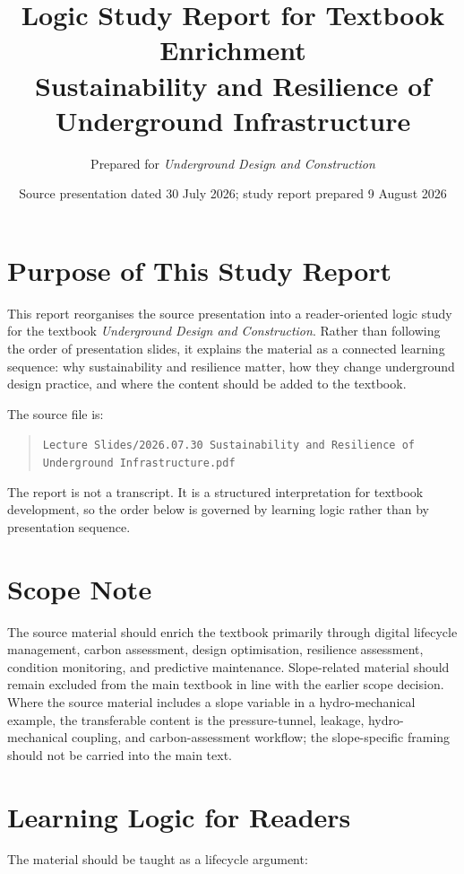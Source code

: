 \documentclass[11pt]{article}
\title{Logic Study Report for Textbook Enrichment\\
Sustainability and Resilience of Underground Infrastructure}
\author{Prepared for \textit{Underground Design and Construction}}
\date{Source presentation dated 30 July 2026; study report prepared 9 August 2026}
\begin{document}
\maketitle

\section*{Purpose of This Study Report}

This report reorganises the source presentation into a reader-oriented logic
study for the textbook \textit{Underground Design and Construction}. Rather
than following the order of presentation slides, it explains the material as a
connected learning sequence: why sustainability and resilience matter, how they
change underground design practice, and where the content should be added to
the textbook.

The source file is:

\begin{quote}
\texttt{Lecture Slides/2026.07.30 Sustainability and Resilience of Underground Infrastructure.pdf}
\end{quote}

The report is not a transcript. It is a structured interpretation for textbook
development, so the order below is governed by learning logic rather than by
presentation sequence.

\section*{Scope Note}

The source material should enrich the textbook primarily through digital lifecycle
management, carbon assessment, design optimisation, resilience assessment,
condition monitoring, and predictive maintenance. Slope-related material should
remain excluded from the main textbook in line with the earlier scope decision.
Where the source material includes a slope variable in a hydro-mechanical example,
the transferable content is the pressure-tunnel, leakage, hydro-mechanical
coupling, and carbon-assessment workflow; the slope-specific framing should not
be carried into the main text.

\section{Learning Logic for Readers}

The material should be taught as a lifecycle argument:
\end{document}
